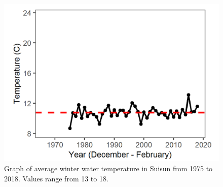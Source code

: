 \documentclass[
]{book}
\begin{document}
\begin{panel-grid}
\begin{columns-nocenter}
\begin{column800}
\begin{expand}
\end{expand}

\end{column800}

\begin{column40}

~

\end{column40}

\begin{column800}

\begin{expand}

\begin{figure}
\includegraphics[width=15.25in]{figures/temp_sswinter} \caption{Graph of average winter water temperature in Suisun from 1975 to 2018. Values range from 13 to 18.}\label{fig:unnamed-chunk-153}
\end{figure}

\end{expand}

\end{column800}

\begin{column40}

~

\end{column40}

\begin{column800}

\begin{expand}


\end{expand}
\end{column800}
\end{columns-nocenter}
\end{panel-grid}
\end{document}
